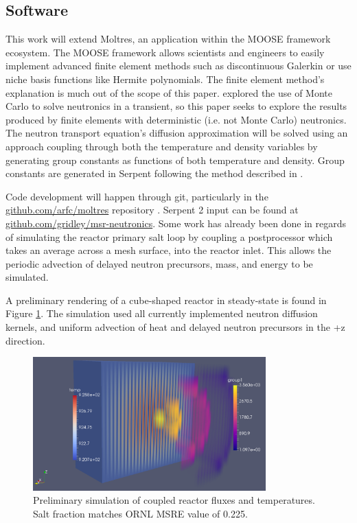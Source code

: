 \subsection{Software}
This work will extend Moltres, an application within the MOOSE framework ecosystem. The MOOSE framework \cite{gaston_moose:_2009} allows scientists and engineers to easily implement advanced finite element methods such as discontinuous Galerkin or use niche basis functions like Hermite polynomials. The finite element method’s explanation is much out of the scope of this paper. \cite{aufiero_calculating_2014} explored the use of Monte Carlo to solve neutronics in a transient, so this paper seeks to explore the results produced by finite elements with deterministic (i.e. not Monte Carlo) neutronics. The neutron transport equation’s diffusion approximation will be solved using an approach coupling through both the temperature and density variables by generating group constants as functions of both temperature and density. Group constants are generated in Serpent following the method described in \cite{fridman_use_2011}.

	Code development will happen through git, particularly in the \url{github.com/arfc/moltres} repository \cite{moltres}. Serpent 2 input can be found at \url{github.com/gridley/msr-neutronics}. Some work has already been done in regards of simulating the reactor primary salt loop by coupling a postprocessor which takes an average across a mesh surface, into the reactor inlet. This allows the periodic advection of delayed neutron precursors, mass, and energy to be simulated.

A preliminary rendering of a cube-shaped reactor in steady-state is found in Figure \ref{fig:cubefig}. The simulation used all currently implemented neutron diffusion kernels, and uniform advection of heat and delayed neutron precursors in the +z direction.

\begin{figure}[ht]
\centering
\includegraphics[width=0.8\textwidth]{cuboidal.png}
\caption{Preliminary simulation of coupled reactor fluxes and temperatures. Salt fraction matches ORNL MSRE value of 0.225.}
\label{fig:cubefig}
\end{figure}

